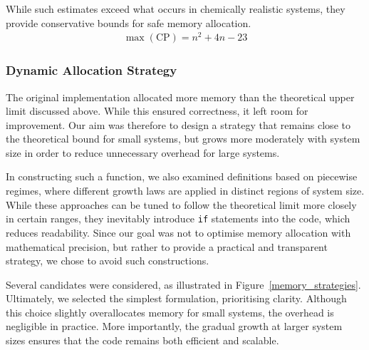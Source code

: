 While such estimates exceed what occurs in chemically realistic
systems, they provide conservative bounds for safe memory allocation.
%
\begin{align}
  \max(\text{CP}) = n^2 + 4n -23
\end{align}

\subsubsection{Dynamic Allocation Strategy}

The original implementation allocated more memory than the theoretical upper
limit discussed above. While this ensured correctness, it left room for
improvement. Our aim was therefore to design a strategy that remains close to
the theoretical bound for small systems, but grows more moderately with system
size in order to reduce unnecessary overhead for large systems.  

\vspace{0.5cm}%

In constructing such a function, we also examined definitions based on
piecewise regimes, where different growth laws are applied in distinct regions
of system size. While these approaches can be tuned to follow the theoretical
limit more closely in certain ranges, they inevitably introduce \texttt{if}
statements into the code, which reduces readability.  Since our goal was not to
optimise memory allocation with mathematical precision, but rather to provide a
practical and transparent strategy, we chose to avoid such constructions. 

\vspace{0.5cm}%

Several candidates were considered, as illustrated in
Figure~\ref{memory_strategies}. Ultimately, we selected the simplest
formulation, prioritising clarity.  Although this choice slightly overallocates
memory for small systems, the overhead is negligible in practice. More
importantly, the gradual growth at larger system sizes ensures that the code
remains both efficient and scalable.

